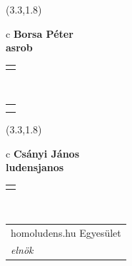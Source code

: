 \documentclass[11pt]{article}
\begin{document}
\makebox(3.3,1.8){
  \renewcommand\arraystretch{1.3}
  \begin{tabular}[c]{c}
    \hspace{8.5mm}
    \LARGE\bf{ Borsa Péter }\\
    \hspace{8.5mm}
    \Large{ asrob }\\
    \renewcommand\arraystretch{3}
    \begin{tabular}[c]{c}
      \centering
      \fontfamily{phv}\selectfont{
        \textbf{
          \textsc{
            \scriptsize{
            \color{Bright}{ Ismerkedő }\color{Dark}{ Webmester }\color{Bright}{ Sminkmester }\color{Bright}{ Programozó }
            }
          }
        }
      }
    \end{tabular}
    \\
    \renewcommand\arraystretch{1}
    \begin{tabular}{p{3.3in}}
      \hspace{.7cm}\\
      \hspace{.7cm}\emph{  }\\
    \end{tabular}
  \end{tabular}
}

\makebox(3.3,1.8){
  \renewcommand\arraystretch{1.3}
  \begin{tabular}[c]{c}
    \hspace{8.5mm}
    \LARGE\bf{ Csányi János }\\
    \hspace{8.5mm}
    \Large{ ludensjanos }\\
    \renewcommand\arraystretch{3}
    \begin{tabular}[c]{c}
      \centering
      \fontfamily{phv}\selectfont{
        \textbf{
          \textsc{
            \scriptsize{
            \color{Bright}{ Ismerkedő }\color{Dark}{ Webmester }\color{Bright}{ Sminkmester }\color{Bright}{ Programozó }
            }
          }
        }
      }
    \end{tabular}
    \\
    \renewcommand\arraystretch{1}
    \begin{tabular}{p{3.3in}}
      \hspace{.7cm}homoludens.hu Egyesület\\
      \hspace{.7cm}\emph{ elnök }\\
    \end{tabular}
  \end{tabular}
}
\end{document}
